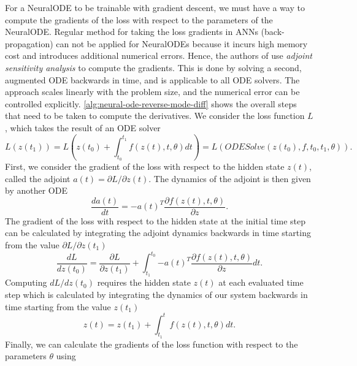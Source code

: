 For a \gls{NeuralODE} to be trainable with gradient descent, we must have a way to compute the gradients of the loss with respect to the parameters of the \gls{NeuralODE}.
Regular method for taking the loss gradients in \glspl{ANN} (back-propagation) can not be applied for \glspl{NeuralODE} because it incurs high memory cost and introduces additional numerical errors.
Hence, the authors of \cite{chenNeuralOrdinaryDifferential2019} use \textit{adjoint sensitivity analysis} to compute the gradients.
This is done by solving a second, augmented \gls{ODE} backwards in time, and is applicable to all \gls{ODE} solvers.
The approach scales linearly with the problem size, and the numerical error can be controlled explicitly.
\autoref{alg:neural-ode-reverse-mode-diff} shows the overall steps that need to be taken to compute the derivatives.
We consider the loss function $L$, which takes the result of an \gls{ODE} solver
\begin{equation*}
    L(z(t_1)) = L\left(z(t_0) + \int_{t_0}^{t_1}{f(z(t), t, \theta)dt}\right) = L(ODESolve(z(t_0), f, t_0, t_1, \theta)).
\end{equation*}
First, we consider the gradient of the loss with respect to the hidden state $z(t)$, called the adjoint $a(t) = \partial L / \partial z(t)$.
The dynamics of the adjoint is then given by another \gls{ODE}
\begin{equation*}
    \frac{da(t)}{dt} = -a(t)^T\frac{\partial f(z(t), t, \theta)}{\partial z}.
\end{equation*}
The gradient of the loss with respect to the hidden state at the initial time step can be calculated by integrating the adjoint dynamics backwards in time starting from the value $\partial L / \partial z(t_1)$
\begin{equation}
    \frac{dL}{dz(t_0)} = \frac{\partial L}{\partial z(t_1)} + \int_{t_1}^{t_0}{-a(t)^T\frac{\partial f(z(t), t, \theta)}{\partial z}} dt.
    \label{eq:neural-ode-loss-wrt-initial-hidden-state}
\end{equation}
Computing $dL/dz(t_0)$ requires the hidden state $z(t)$ at each evaluated time step which is calculated by integrating the dynamics of our system backwards in time starting from the value $z(t_1)$
\begin{equation}
    z(t) = z(t_1) + \int_{t_1}^{t}{f(z(t), t, \theta)dt}.
    \label{eq:neural-ode-hidden-state-backwards-integral}
\end{equation}
Finally, we can calculate the gradients of the loss function with respect to the parameters $\theta$ using
